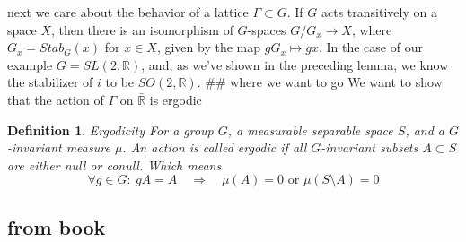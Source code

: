 \documentclass[
  12pt
]{article}
\theoremstyle{break}
\newtheorem{defn}{Definition}[thm]
\theoremstyle{plain}
\begin{document}
  next we care about the behavior of a lattice $\Gamma \subset G$. If
  $G$ acts transitively on a space $X$, then there is an isomorphism
  of $G$-spaces $G/G_x \rightarrow X$, where $G_x = Stab_G (x)$ for
  $x \in X$, given by the map $gG_x \mapsto gx$. In the case of our
  example $G = SL(2, \mathbb{R})$, and, as we've shown in the preceding
  lemma, we know the stabilizer of $i$ to be $SO(2,\mathbb{R})$. \#\#
  where we want to go We want to show that the action of $\Gamma$ on
  $\bar{\mathbb{R}}$ is ergodic

  \begin{defn}{Ergodicity}
  For a group $G$, a measurable separable space $S$, and a $G$-invariant measure $\mu$. An action is called ergodic if all $G$-invariant subsets $A\subset S$ are either null or conull. Which means 
  $$
  \forall g\in G:\ gA = A \quad \Rightarrow \quad \mu(A)=0 \text{ or } \mu(S\setminus A)=0
  $$
  \end{defn}

  \hypertarget{from-book}{%
  \subsection{from book}\label{from-book}}
\end{document}
